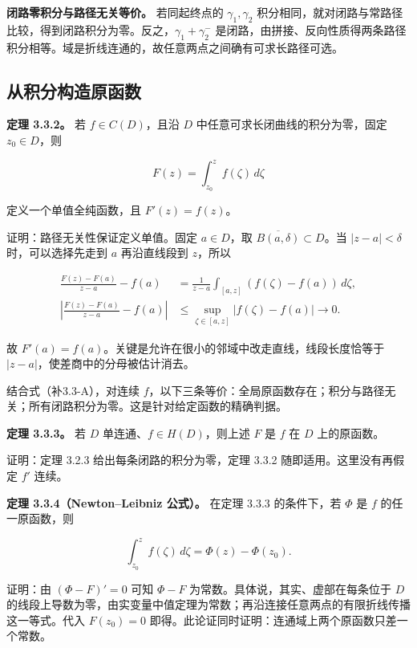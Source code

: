 \documentclass[11pt,a4paper]{article}
\begin{document}
\textbf{闭路零积分与路径无关等价。} 若同起终点的 \(\gamma_1,\gamma_2\)
积分相同，就对闭路与常路径比较，得到闭路积分为零。反之，\(\gamma_1+\gamma_2^-\)
是闭路，由拼接、反向性质得两条路径积分相等。域是折线连通的，故任意两点之间确有可求长路径可选。

\subsection{从积分构造原函数}\label{ch03-s3-ux4eceux79efux5206ux6784ux9020ux539fux51fdux6570}

\textbf{定理 3.3.2。} 若 \(f\in C(D)\)，且沿 \(D\)
中任意可求长闭曲线的积分为零，固定 \(z_0\in D\)，则

\[
F(z)=\int_{z_0}^{z}f(\zeta)\,d\zeta
\]

定义一个单值全纯函数，且 \(F'(z)=f(z)\)。

证明：路径无关性保证定义单值。固定 \(a\in D\)，取
\(\overline{B(a,\delta)}\subset D\)。当 \(|z-a|<\delta\)
时，可以选择先走到 \(a\) 再沿直线段到 \(z\)，所以

\[
\begin{aligned}
\frac{F(z)-F(a)}{z-a}-f(a)
&=\frac1{z-a}\int_{[a,z]}(f(\zeta)-f(a))\,d\zeta,\\
\left|\frac{F(z)-F(a)}{z-a}-f(a)\right|
&\le\sup_{\zeta\in[a,z]}|f(\zeta)-f(a)|\longrightarrow0.
\end{aligned}
\]

故 \(F'(a)=f(a)\)。关键是允许在很小的邻域中改走直线，线段长度恰等于
\(|z-a|\)，使差商中的分母被估计消去。

结合式（补3.3-A），对连续
\(f\)，以下三条等价：全局原函数存在；积分与路径无关；所有闭路积分为零。这是针对给定函数的精确判据。

\textbf{定理 3.3.3。} 若 \(D\) 单连通、\(f\in H(D)\)，则上述 \(F\) 是
\(f\) 在 \(D\) 上的原函数。

证明：定理 3.2.3 给出每条闭路的积分为零，定理 3.3.2
随即适用。这里没有再假定 \(f'\) 连续。

\textbf{定理 3.3.4（Newton--Leibniz 公式）。} 在定理 3.3.3 的条件下，若
\(\Phi\) 是 \(f\) 的任一原函数，则

\[
\int_{z_0}^{z}f(\zeta)\,d\zeta=\Phi(z)-\Phi(z_0).
\]

证明：由 \((\Phi-F)'=0\) 可知 \(\Phi-F\)
为常数。具体说，其实、虚部在每条位于 \(D\)
的线段上导数为零，由实变量中值定理为常数；再沿连接任意两点的有限折线传播这一等式。代入
\(F(z_0)=0\) 即得。此论证同时证明：连通域上两个原函数只差一个常数。
\end{document}

